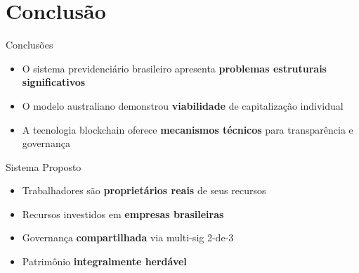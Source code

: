 \documentclass{libs/ufc_format}
\begin{document}
\section{Conclusão}
\begin{frame}{Conclusões}
    \begin{itemize}
        \item O sistema previdenciário brasileiro apresenta \textbf{problemas estruturais significativos}
        \item O modelo australiano demonstrou \textbf{viabilidade} de capitalização individual
        \item A tecnologia blockchain oferece \textbf{mecanismos técnicos} para transparência e governança
    \end{itemize}
    
    \vspace{0.3cm}
    
    \begin{exampleblock}{Sistema Proposto}
        \begin{itemize}
            \item Trabalhadores são \textbf{proprietários reais} de seus recursos
            \item Recursos investidos em \textbf{empresas brasileiras}
            \item Governança \textbf{compartilhada} via multi-sig 2-de-3
            \item Patrimônio \textbf{integralmente herdável}
        \end{itemize}
    \end{exampleblock}
\end{frame}
\end{document}
